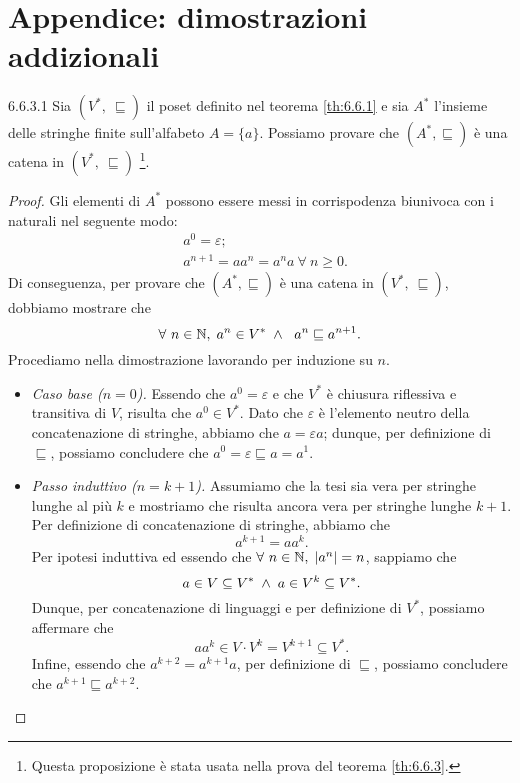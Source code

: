 \chapter{Appendice: dimostrazioni addizionali}
\label{appendix:dim-induciton}

\begin{customprop}{6.6.3.1}
\label{prop:6.6.3.1}
Sia $(V^*,\ \sqsubseteq )$ il poset definito nel teorema \ref{th:6.6.1} e sia $A^*$ l'insieme delle stringhe finite sull'alfabeto $A = \{a\}$. Possiamo provare che $(A^*, \sqsubseteq)$ è una catena in $(V^*,\ \sqsubseteq )$ \footnote{Questa proposizione è stata usata nella prova del teorema \ref{th:6.6.3}.}.
\end{customprop}
\begin{proof}
Gli elementi di $A^*$ possono essere messi in corrispodenza biunivoca con i naturali nel seguente modo:
\begin{align*}
	& a^0 = \varepsilon;\\
	& a^{n+1} = a a^n = a^n a \ \forall \ n \geq 0.
\end{align*}
Di conseguenza, per provare che $(A^*, \sqsubseteq)$ è una catena in $(V^*,\ \sqsubseteq )$, dobbiamo mostrare che \[
	\forall\ n \in \mathbb{N} ,\; a^n \in V^* \; \land \; \ a^n \sqsubseteq a^{n+1}.
\]
Procediamo nella dimostrazione lavorando per induzione su $n$.
\begin{itemize}
\item \textit{Caso base ($n=0$).} Essendo che $a^0 = \varepsilon$ e che $V^*$ è chiusura riflessiva e transitiva di $V$, risulta che $a^0 \in V^*$. Dato che $\varepsilon$ è l'elemento neutro della concatenazione di stringhe, abbiamo che $a = \varepsilon a$; dunque, per definizione di $\sqsubseteq$, possiamo concludere che $a^0 = \varepsilon \sqsubseteq a = a^1$.
\item \textit{Passo induttivo ($n=k+1$).} Assumiamo che la tesi sia vera per stringhe lunghe al più $k$ e mostriamo che risulta ancora vera per stringhe lunghe $k+1$. Per definizione di concatenazione di stringhe, abbiamo che \[
	a^{k+1} = a a^k.
\]
Per ipotesi induttiva ed essendo che $\forall\ n \in \N \valeche |a^n| = n$, sappiamo che \[
	a \in V \subseteq V^* \; \land \; a \in V^k \subseteq V^*.
\]
Dunque, per concatenazione di linguaggi e per definizione di $V^*$, possiamo affermare che \[
	a a^k \in V \cdot V^k = V^{k+1} \subseteq V^*.
\]
Infine, essendo che $a^{k+2} = a^{k+1} a$, per definizione di $\sqsubseteq$, possiamo concludere che $a^{k+1} \sqsubseteq a^{k+2}$.
\end{itemize}
\end{proof}

